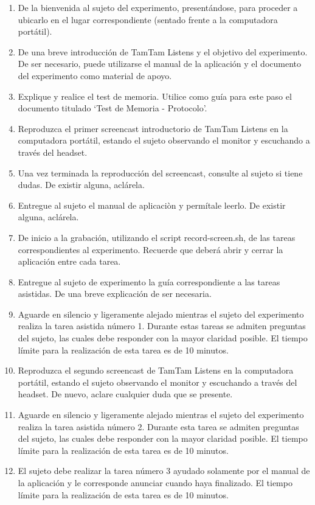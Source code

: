 \begin{enumerate}
    \item De la bienvenida al sujeto del experimento, present\'andose, para proceder a ubicarlo en el lugar correspondiente (sentado frente a la computadora port\'atil).
    \item De una breve introducci\'on de TamTam Listens y el objetivo del experimento. De ser necesario, puede utilizarse el manual de la aplicaci\'on y el documento del experimento como material de apoyo.
    \item Explique y realice el test de memoria. Utilice como gu\'ia para este paso el documento titulado ‘Test de Memoria - Protocolo’.
    \item Reproduzca el primer screencast introductorio de TamTam Listens en la computadora port\'atil, estando el sujeto observando el monitor y escuchando a trav\'es del headset.
    \item Una vez terminada la reproducci\'on del screencast, consulte al sujeto si tiene dudas. De existir alguna, acl\'arela.
    \item Entregue al sujeto el manual de aplicaciòn y perm\'itale leerlo. De existir alguna, acl\'arela.
    \item De inicio a la grabaci\'on, utilizando el script record-screen.sh, de las tareas correspondientes al experimento. Recuerde que deber\'a abrir y cerrar la aplicaci\'on entre cada tarea.
    \item Entregue al sujeto de experimento la gu\'ia correspondiente a las tareas asistidas. De una breve explicaci\'on de ser necesaria.
    \item Aguarde en silencio y ligeramente alejado mientras el sujeto del experimento realiza la tarea asistida n\'umero 1. Durante estas tareas se admiten preguntas del sujeto, las cuales debe responder con la mayor claridad posible. El tiempo l\'imite para la realizaci\'on de esta tarea es de 10 minutos.
    \item Reproduzca el segundo screencast de TamTam Listens en la computadora port\'atil, estando el sujeto observando el monitor y escuchando a trav\'es del headset. De nuevo, aclare cualquier duda que se presente.
    \item Aguarde en silencio y ligeramente alejado mientras el sujeto del experimento realiza la tarea asistida n\'umero 2. Durante esta tarea se admiten preguntas del sujeto, las cuales debe responder con la mayor claridad posible. El tiempo l\'imite para la realizaci\'on de esta tarea es de 10 minutos.
    \item El sujeto debe realizar la tarea n\'umero 3 ayudado solamente por el manual de la aplicaci\'on y le corresponde anunciar cuando haya finalizado. El tiempo l\'imite para la realizaci\'on de esta tarea es de 10 minutos.

\end{enumerate}
